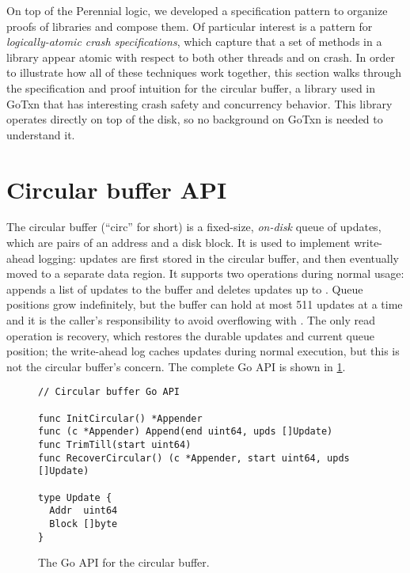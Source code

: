 On top of the Perennial logic, we developed a specification pattern to organize proofs
of libraries and compose them. Of particular interest is a pattern for
\emph{logically-atomic crash specifications}, which capture that a set of
methods in a library appear atomic with respect to both other threads and on
crash. In order to illustrate how all of these techniques work together, this
section walks through the specification and proof intuition for the circular
buffer, a library used in GoTxn that has interesting crash safety and
concurrency behavior. This library operates directly on top of the disk, so no
background on GoTxn is needed to understand it.

\section{Circular buffer API}

The circular buffer (``circ'' for short) is a fixed-size, \emph{on-disk} queue of
updates, which are pairs of an address and a disk block. It is used to implement
write-ahead logging: updates are first stored in the circular buffer, and
then eventually moved to a separate data region. It supports two operations
during normal usage:  appends a list of updates to the buffer
and  deletes updates up to . Queue positions grow
indefinitely, but the buffer can hold at most 511 updates at a time and it
is the caller's responsibility to avoid overflowing with . The only
read operation is recovery, which restores the durable updates and current queue
position; the write-ahead log caches updates during normal execution, but this
is not the circular buffer's concern. The complete Go API is shown in
\cref{fig:circ:api}.

\begin{figure}[ht]
\begin{verbatim}
// Circular buffer Go API

func InitCircular() *Appender
func (c *Appender) Append(end uint64, upds []Update)
func TrimTill(start uint64)
func RecoverCircular() (c *Appender, start uint64, upds []Update)

type Update {
  Addr  uint64
  Block []byte
}
\end{verbatim}
  \caption{The Go API for the circular buffer.}%
  \label{fig:circ:api}
\end{figure}

